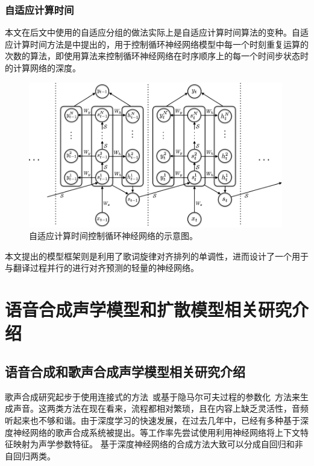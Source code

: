 \subsubsection{自适应计算时间}
本文在后文中使用的自适应分组的做法实际上是自适应计算时间算法的变种。自适应计算时间方法是\citet{act}中提出的，用于控制循环神经网络模型中每一个时刻重复运算的次数的算法，即使用算法来控制循环神经网络在时序顺序上的每一个时间步状态时的计算网络的深度。
\begin{figure}[ht]
  \includegraphics[width=0.99\textwidth]{figure/related/act.png}
  \caption{自适应计算时间控制循环神经网络的示意图。}
  \label{fig:act_rnn}
\end{figure}


本文提出的模型框架则是利用了歌词旋律对齐排列的单调性，进而设计了一个用于与翻译过程并行的进行对齐预测的轻量的神经网络。
\section{语音合成声学模型和扩散模型相关研究介绍}
\subsection{语音合成和歌声合成声学模型相关研究介绍}
\label{sec:svs_intro}
歌声合成研究起步于使用连接式的方法~\citep{macon1997concatenation,kenmochi2007vocaloid}或基于隐马尔可夫过程的参数化~\citep{saino2006hmm,oura2010recent}方法来生成声音。这两类方法在现在看来，流程都相对繁琐，且在内容上缺乏灵活性，音频听起来也不够和谐。由于深度学习的快速发展，在过去几年中，已经有多种基于深度神经网络的歌声合成系统被提出。\citet{nishimura2016singing,blaauw2017neural,kim2018korean,nakamura2019singing,gu2020bytesing}等工作率先尝试使用利用神经网络将上下文特征映射为声学参数特征。
基于深度神经网络的合成方法大致可以分成自回归和非自回归两类。
